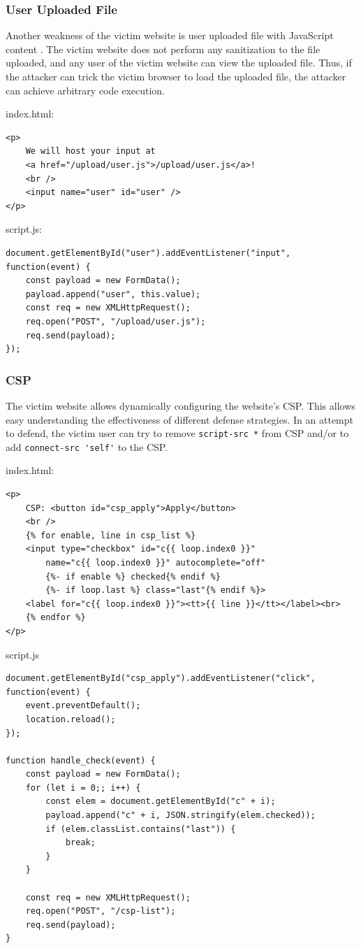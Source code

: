 \documentclass[conference]{IEEEtran}
\begin{document}
\subsubsection{User Uploaded File}

Another weakness of the victim website is user uploaded file with JavaScript content \cite{cwe_upload_file}. The victim website does not perform any sanitization to the file uploaded, and any user of the victim website can view the uploaded file. Thus, if the attacker can trick the victim browser to load the uploaded file, the attacker can achieve arbitrary code execution.

index.html:
\begin{lstlisting}
<p>
    We will host your input at
    <a href="/upload/user.js">/upload/user.js</a>!
    <br />
    <input name="user" id="user" />
</p>
\end{lstlisting}

script.js:
\begin{lstlisting}
document.getElementById("user").addEventListener("input", function(event) {
	const payload = new FormData();
	payload.append("user", this.value);
	const req = new XMLHttpRequest();
	req.open("POST", "/upload/user.js");
	req.send(payload);
});
\end{lstlisting}

\subsubsection{CSP}

The victim website allows dynamically configuring the website's CSP. This allows easy understanding the effectiveness of different defense strategies. In an attempt to defend, the victim user can try to remove \lstinline{script-src *} from CSP and/or to add \lstinline{connect-src 'self'} to the CSP.

index.html:
\begin{lstlisting}
<p>
    CSP: <button id="csp_apply">Apply</button>
    <br />
    {% for enable, line in csp_list %}
    <input type="checkbox" id="c{{ loop.index0 }}"
        name="c{{ loop.index0 }}" autocomplete="off"
        {%- if enable %} checked{% endif %}
        {%- if loop.last %} class="last"{% endif %}>
    <label for="c{{ loop.index0 }}"><tt>{{ line }}</tt></label><br>
    {% endfor %}
</p>
\end{lstlisting}

script.js
\begin{lstlisting}
document.getElementById("csp_apply").addEventListener("click", function(event) {
	event.preventDefault();
	location.reload();
});

function handle_check(event) {
	const payload = new FormData();
	for (let i = 0;; i++) {
		const elem = document.getElementById("c" + i);
		payload.append("c" + i, JSON.stringify(elem.checked));
		if (elem.classList.contains("last")) {
			break;
		}
	}

	const req = new XMLHttpRequest();
	req.open("POST", "/csp-list");
	req.send(payload);
}
\end{lstlisting}
\end{document}
